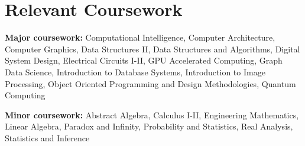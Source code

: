 \section{Relevant Coursework}
\vspace{2pt}
\resumeSubHeadingListStart
{\item{
                  \textbf{Major coursework:}{
                        Computational Intelligence,
                        Computer Architecture,
                        Computer Graphics,
                        Data Structures II,
                        Data Structures and Algorithms,
                        Digital System Design,
                        Electrical Circuits I-II,
                        GPU Accelerated Computing,
                        Graph Data Science,
                        Introduction to Database Systems,
                        Introduction to Image Processing,
                        Object Oriented Programming and Design Methodologies,
                        Quantum Computing
                  } \\ \vspace{3pt}

                  \textbf{Minor coursework:}{
                        Abstract Algebra,
                        Calculus I-II,
                        Engineering Mathematics,
                        Linear Algebra,
                        Paradox and Infinity,
                        Probability and Statistics,
                        Real Analysis,
                        Statistics and Inference
                  }
            }}
\resumeSubHeadingListEnd
